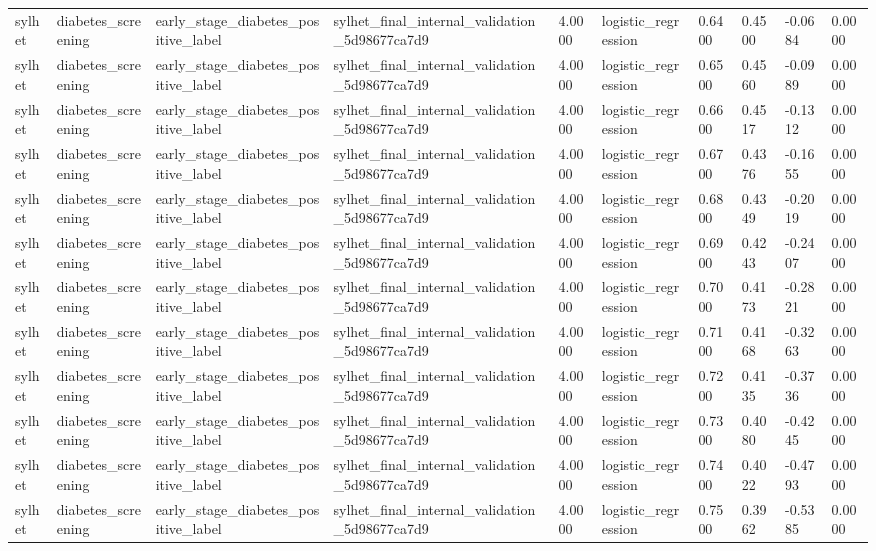 \begin{tabular}{llllllllll}
sylhet & diabetes\_screening & early\_stage\_diabetes\_positive\_label & sylhet\_final\_internal\_validation\_5d98677ca7d9 & 4.0000 & logistic\_regression & 0.6400 & 0.4500 & -0.0684 & 0.0000 \\
sylhet & diabetes\_screening & early\_stage\_diabetes\_positive\_label & sylhet\_final\_internal\_validation\_5d98677ca7d9 & 4.0000 & logistic\_regression & 0.6500 & 0.4560 & -0.0989 & 0.0000 \\
sylhet & diabetes\_screening & early\_stage\_diabetes\_positive\_label & sylhet\_final\_internal\_validation\_5d98677ca7d9 & 4.0000 & logistic\_regression & 0.6600 & 0.4517 & -0.1312 & 0.0000 \\
sylhet & diabetes\_screening & early\_stage\_diabetes\_positive\_label & sylhet\_final\_internal\_validation\_5d98677ca7d9 & 4.0000 & logistic\_regression & 0.6700 & 0.4376 & -0.1655 & 0.0000 \\
sylhet & diabetes\_screening & early\_stage\_diabetes\_positive\_label & sylhet\_final\_internal\_validation\_5d98677ca7d9 & 4.0000 & logistic\_regression & 0.6800 & 0.4349 & -0.2019 & 0.0000 \\
sylhet & diabetes\_screening & early\_stage\_diabetes\_positive\_label & sylhet\_final\_internal\_validation\_5d98677ca7d9 & 4.0000 & logistic\_regression & 0.6900 & 0.4243 & -0.2407 & 0.0000 \\
sylhet & diabetes\_screening & early\_stage\_diabetes\_positive\_label & sylhet\_final\_internal\_validation\_5d98677ca7d9 & 4.0000 & logistic\_regression & 0.7000 & 0.4173 & -0.2821 & 0.0000 \\
sylhet & diabetes\_screening & early\_stage\_diabetes\_positive\_label & sylhet\_final\_internal\_validation\_5d98677ca7d9 & 4.0000 & logistic\_regression & 0.7100 & 0.4168 & -0.3263 & 0.0000 \\
sylhet & diabetes\_screening & early\_stage\_diabetes\_positive\_label & sylhet\_final\_internal\_validation\_5d98677ca7d9 & 4.0000 & logistic\_regression & 0.7200 & 0.4135 & -0.3736 & 0.0000 \\
sylhet & diabetes\_screening & early\_stage\_diabetes\_positive\_label & sylhet\_final\_internal\_validation\_5d98677ca7d9 & 4.0000 & logistic\_regression & 0.7300 & 0.4080 & -0.4245 & 0.0000 \\
sylhet & diabetes\_screening & early\_stage\_diabetes\_positive\_label & sylhet\_final\_internal\_validation\_5d98677ca7d9 & 4.0000 & logistic\_regression & 0.7400 & 0.4022 & -0.4793 & 0.0000 \\
sylhet & diabetes\_screening & early\_stage\_diabetes\_positive\_label & sylhet\_final\_internal\_validation\_5d98677ca7d9 & 4.0000 & logistic\_regression & 0.7500 & 0.3962 & -0.5385 & 0.0000 \\

\end{tabular}
